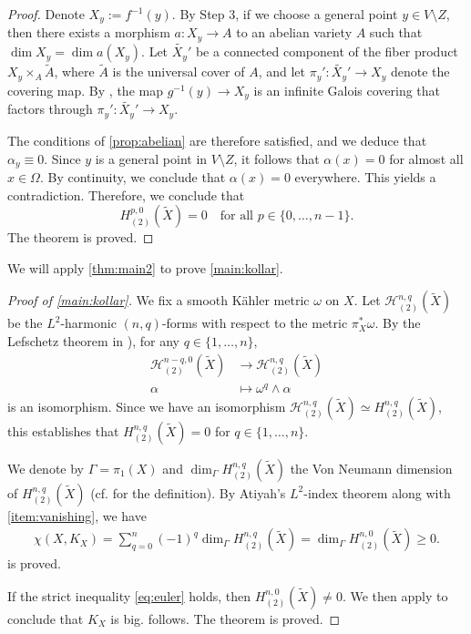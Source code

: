 \documentclass[11pt,a4paper,english]{smfart}
\theoremstyle{plain}
\theoremstyle{definition}
\theoremstyle{plain}
\def\cH{\mathcal{H}}
\begin{document}
\begin{proof}
	Denote \( X_y := f^{-1}(y) \). By Step 3, if we choose a general point \( y \in V \setminus Z \), then there exists a morphism \( a: X_y \to A \) to an abelian variety \( A \) such that \( \dim X_y = \dim a(X_y) \). Let \( \widetilde{X_y}' \) be a connected component of the fiber product \( X_y \times_{A} \widetilde{A} \),  where $\widetilde{A}$ is the universal cover of $A$, and let \( \pi_y': \widetilde{X_y}' \to X_y \) denote the covering map. By \cite[Lemma 5.1]{EKPR12}, the map \( g^{-1}(y) \to X_y \) is an infinite Galois covering that factors through \( \pi_y': \widetilde{X_y}' \to X_y \).
	
	The conditions of \cref{prop:abelian} are therefore satisfied, and we deduce that \( \alpha_y \equiv 0 \). Since \( y \) is a general point in \( V \setminus Z \), it follows that \( \alpha(x) = 0 \) for almost all \( x \in \Omega \). By continuity, we conclude that \( \alpha(x) = 0 \) everywhere. This yields a contradiction. Therefore, we conclude that
	\[
	H^{p,0}_{(2)}(\widetilde{X}) = 0 \quad \text{for all } p \in \{0, \ldots, n-1\}.
	\]
	The theorem is proved.
\end{proof} 
We will apply \cref{thm:main2} to prove \cref{main:kollar}.
\begin{proof} [Proof of \cref{main:kollar}]
	We fix a smooth K\"ahler metric $\omega$ on $X$. 	Let 	$\cH_{(2)}^{n,q}(\widetilde{X})	$ be the $L^2$-harmonic $(n,q)$-forms with respect to the metric $\pi_X^*\omega$. By the Lefschetz theorem in  \cite[Theorem 1.2.A]{Gr}),  for any $q\in \{1,\ldots,n\}$, 
	\begin{align*}
		\cH_{(2)}^{n-q,0}(\widetilde{X})&\to  	\cH_{(2)}^{n,q}(\widetilde{X})\\\alpha&\mapsto \omega^q\wedge\alpha
	\end{align*}
	is an isomorphism. Since we have an isomorphism $\cH_{(2)}^{n,q}(\widetilde{X})\simeq H_{(2)}^{n,q}(\widetilde{X})$,  this establishes that $ H_{(2)}^{n,q}(\widetilde{X})=0$ for $q\in \{1,\ldots,n\}$. 
	
	
	We denote by $\Gamma=\pi_1(X)$ and $\dim_{\Gamma}H^{n,q}_{(2)}(\widetilde{X})$ the Von Neumann dimension of $H^{n,q}_{(2)}(\widetilde{X})$ (cf. \cite{Ati76} for the definition). 
	By Atiyah's $L^2$-index theorem along with \cref{item:vanishing}, we have
	\begin{align} \label{eq:euler}	\chi(X,K_X)=\sum_{q=0}^{n}(-1)^q\dim_{\Gamma}H^{n,q}_{(2)}(\widetilde{X})= \dim_{\Gamma}H^{n,0}_{(2)}(\widetilde{X})\geq 0.
	\end{align} 
	 is proved. 
	
	
	If the strict  inequality   \eqref{eq:euler}  holds, then $H^{n,0}_{(2)}(\widetilde{X})\neq 0$. We then apply \cite[Corollary 13.10]{Kol95} to conclude that $K_X$ is big.  follows.  The theorem is proved. 
\end{proof}  
 
\end{document}
